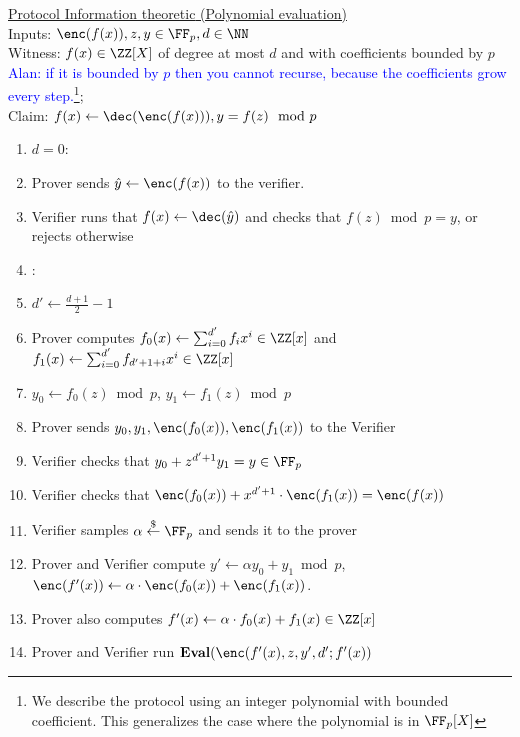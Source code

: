 \documentclass{article}
\begin{document}
\begin{small}
 \begin{minipage}{1.1\textwidth}
\begin{mdframed}[userdefinedwidth=1\textwidth]  \label{prot:Opening}
	\noindent \underline{\textsf{Protocol \eval{} Information theoretic} (Polynomial evaluation)}\\
Inputs: $\enc(f(x)),z,y\in \FF_p,d \in \NN $\\
Witness: $f(x) \in \ZZ[X]$ of degree at most $d$ and with coefficients bounded by $p$ \textcolor{blue}{Alan: if it is bounded by $p$ then you cannot recurse, because the coefficients grow every step.}\footnote{We describe the protocol using an integer polynomial with bounded coefficient. This generalizes the case where the polynomial is in $\FF_p[X]$};\\ 
Claim: $f(x)\gets \dec(\enc(f(x))), y=f(z) \mod p$

\begin{enumerate}[nolistsep]
\item \pcif $d=0$:
\item \pcind[1] Prover sends $\hat{y}\gets \enc(f(x))$ to the verifier. 
\item \pcind[1] Verifier runs that $f(x)\gets \dec(\hat{y})$ and checks that  $f(z) \bmod p=y$, or rejects otherwise 
\item \pcelse: 
\item \pcind[1] $d'\gets \frac{d+1}{2}-1$
\item \pcind[1] Prover computes $f_0(x)\gets\sum_{i=0}^{d'} f_i x^i\in \ZZ[x]$ and $f_1(x)\gets\sum_{i=0}^{d'} f_{d'+1+i} x^{i}\in \ZZ[x]$
\item \pcind[1] $y_0\gets f_0(z) \bmod p$, $y_1\gets f_1(z)\bmod p$
\item \pcind[1] Prover sends $y_0,y_1, \enc(f_0(x)),\enc(f_1(x))$ to the Verifier
\item \pcind[1] Verifier checks that $y_0+z^{d'+1} y_1=y\in \FF_p$ 
\item \pcind[1] Verifier checks that $\enc(f_0(x))+x^{d'+1}\cdot \enc(f_1(x))=\enc(f(x))$
\item \pcind[1] Verifier samples $\alpha \sample \FF_p$ and sends it to the prover
\item \pcind[1] Prover and Verifier compute $y'\gets\alpha y_0 +y_1 \bmod p$, $\enc(f'(x))\gets \alpha \cdot \enc(f_0(x)) +\enc(f_1(x))$. 
\item \pcind[1] Prover also computes $f'(x)\gets\alpha  \cdot f_0(x)+f_1(x) \in \ZZ[x]$ 
\item \pcind[1] Prover and Verifier run $\eval(\enc(f'(x),z,y',d';f'(x))$
\end{enumerate}
\end{mdframed}
\end{minipage}
\end{small}
\end{document}
